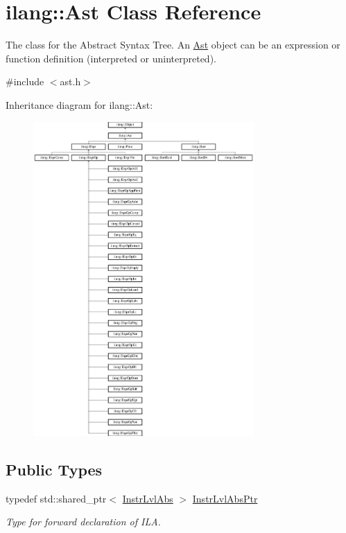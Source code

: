 \hypertarget{classilang_1_1_ast}{}\section{ilang\+:\+:Ast Class Reference}
\label{classilang_1_1_ast}


The class for the Abstract Syntax Tree. An \mbox{\hyperlink{classilang_1_1_ast}{Ast}} object can be an expression or function definition (interpreted or uninterpreted).  




{\ttfamily \#include $<$ast.\+h$>$}

Inheritance diagram for ilang\+:\+:Ast\+:\begin{figure}[H]
\begin{center}
\leavevmode
\includegraphics[height=12.000000cm]{classilang_1_1_ast}
\end{center}
\end{figure}
\subsection*{Public Types}
\begin{DoxyCompactItemize}
\item 
\mbox{\label{classilang_1_1_ast_a7433a1e6c865c5c7f64eb7bceca11ec2}} 
typedef std\+::shared\+\_\+ptr$<$ \mbox{\hyperlink{classilang_1_1_instr_lvl_abs}{Instr\+Lvl\+Abs}} $>$ \mbox{\hyperlink{classilang_1_1_ast_a7433a1e6c865c5c7f64eb7bceca11ec2}{Instr\+Lvl\+Abs\+Ptr}}
\begin{DoxyCompactList}\small\item\em Type for forward declaration of I\+LA. \end{DoxyCompactList}\end{DoxyCompactItemize}

